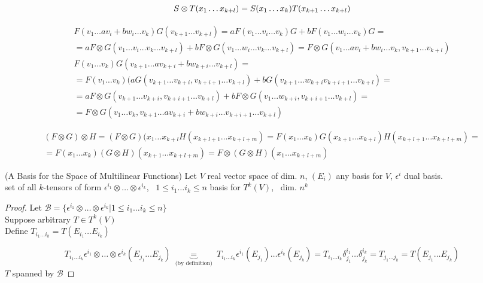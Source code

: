 \[
  S \otimes T(x_1 \dots x_{k+l}) = S(x_1 \dots x_k) T(x_{k+1} \dots x_{k+l}) \\ 
\]

\[
\begin{gathered}
  F(v_1 \dots av_i + bw_i \dots v_k) G(v_{k+1} \dots v_{k+l}) = aF(v_1 \dots v_i \dots v_k) G + b F(v_1 \dots w_i \dots v_k)G = \\
  =  aF\otimes G(v_1 \dots v_i \dots v_k \dots v_{k+l}) + bF\otimes G(v_1 \dots w_i \dots v_k \dots v_{k+l}) = F\otimes G( v_1 \dots a v_i  + b w_i \dots v_k, v_{k+1} \dots v_{k+l} ) \\ 
    F(v_1 \dots v_k) G(v_{k+1} \dots av_{k+i} + bw_{k+i} \dots v_{k+l}) = \\
    = F(v_1 \dots v_k)(aG(v_{k+1} \dots v_{k+i}, v_{k+i +1} \dots v_{k+l} ) + bG(v_{k+1 } \dots w_{k+i} v_{k+i +1} \dots v_{k+l }) = \\ 
    = aF\otimes G(v_{k+1} \dots v_{k+i} , v_{k+i +1} \dots v_{k+l }) + bF\otimes G(v_1 \dots w_{k+i}, v_{k+i + 1} \dots v_{k+l} ) = \\
    = F\otimes G(v_1 \dots v_k, v_{k+1} \dots av_{k+i} + b w_{k+i} \dots v_{k+i +1} \dots v_{k+l })
\end{gathered}
\]

\[
\begin{gathered}
(F\otimes G) \otimes H = (F\otimes G)(x_1 \dots x_{k+l}H(x_{k+l+1} \dots x_{k+l+m }) = F(x_1 \dots x_k) G(x_{k+1} \dots x_{k+l} ) H(x_{k+l+1} \dots x_{k+l+m}) = \\
= F(x_1 \dots x_k)(G\otimes H)(x_{k+1} \dots x_{k+l+m}) = F\otimes (G\otimes H)(x_1 \dots x_{k+l+m})
\end{gathered}
\]


\begin{proposition}[12.4](A Basis for the Space of Multilinear Functions)  Let $V$ real vector space of dim. $n$, $(E_i)$ any basis for $V$, $\epsilon^i$ dual basis.\\
set of all $k$-tensors of form $\epsilon^{i_1} \otimes \dots \otimes \epsilon^{i_k}$, \, $1\leq i_1 \dots i_k \leq n$ basis for $T^k(V)$, \, dim. $n^k$
\end{proposition}

\begin{proof} Let $\mathcal{B} = \lbrace \epsilon^{i_1} \otimes \dots \otimes \epsilon^{i_k} | 1 \leq i_1 \dots i_k \leq n \rbrace$ \\

Suppose arbitrary $T \in T^k(V)$  \\
Define $T_{i_1 \dots i_k} = T(E_{i_1} \dots E_{i_k} )$

\[
T_{i_1 \dots i_k} \epsilon^{i_1} \otimes \dots \otimes \epsilon^{i_k}(E_{j_1} \dots E_{j_k} ) \underbrace{=}_{ \text{ (by definition) } }T_{i_1 \dots i_k} \epsilon^{i_1}(E_{j_1}) \dots \epsilon^{i_k}(E_{j_k}) = T_{i_1 \dots i_k}\delta^{i_1}_{j_1} \dots \delta^{i_k}_{j_k} = T_{j_1 \dots j_k} = T(E_{j_1} \dots E_{j_k} )
\]
$T$ spanned by $\mathcal{B}$

\end{proof}





